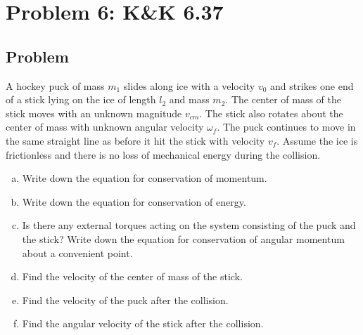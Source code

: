 \documentclass[solutions]{esg8012pset}
\begin{document}
\section*{Problem 6: K\&K 6.37}
\subsection*{Problem}
  A hockey puck of mass $m_1$ slides along ice with a velocity $v_0$ and strikes one end of a stick lying on the ice of length $l_2$ and mass $m_2$. The center of mass of the stick moves with an unknown magnitude $v_{cm}$. The stick also rotates about the center of mass with unknown angular velocity $\omega_{f}$. The puck continues to move in the same straight line as before it hit the stick with velocity $v_f$. Assume the ice is frictionless and there is no loss of mechanical energy during the collision.
  \begin{center}
  \end{center}
  \begin{enumerate}[(a)]
    \item Write down the equation for conservation of momentum.
    \item Write down the equation for conservation of energy.
    \item Is there any external torques acting on the system consisting of the puck and the stick? Write down the equation for conservation of angular momentum about a convenient point.
    \item Find the velocity of the center of mass of the stick.
    \item Find the velocity of the puck after the collision.
    \item Find the angular velocity of the stick after the collision.
  \end{enumerate}
\end{document}
